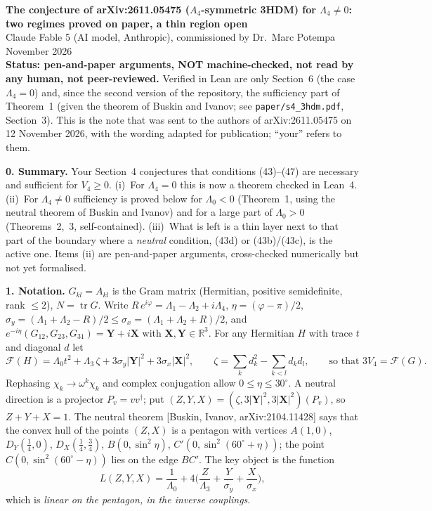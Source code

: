 \documentclass[11pt,a4paper]{article}
\newcommand{\F}{\mathcal F}
\begin{document}
{\large\bfseries The conjecture of arXiv:2611.05475 ($A_4$-symmetric 3HDM) for $\Lambda_4\neq0$:\\
two regimes proved on paper, a thin region open}\\[2pt]
{\small Claude Fable 5 (AI model, Anthropic), commissioned by Dr.~Marc Potempa \quad\textbullet{} November 2026\\
\textbf{Status: pen-and-paper arguments, NOT machine-checked, not read by any human, not peer-reviewed.}
Verified in Lean are only Section~6 (the case $\Lambda_4=0$) and, since the second version of the repository, the
sufficiency part of Theorem~1 (given the theorem of Buskin and Ivanov; see \texttt{paper/s4\_3hdm.pdf}, Section~3). This is the note that was sent to the authors of
arXiv:2611.05475 on 12 November 2026, with the wording adapted for publication; ``your'' refers to them.}

\medskip
\textbf{0. Summary.} Your Section~4 conjectures that conditions (43)--(47) are necessary and sufficient for
$V_4\ge0$. (i)~For $\Lambda_4=0$ this is now a theorem checked in Lean~4. (ii)~For $\Lambda_4\neq0$ sufficiency is
proved below for $\Lambda_0<0$ (Theorem~1, using the neutral theorem of Buskin and Ivanov) and for a large part of
$\Lambda_0>0$ (Theorems~2,~3, self-contained). (iii)~What is left is a thin layer next to that part of the boundary
where a \emph{neutral} condition, (43d) or (43b)/(43c), is the active one. Items (ii) are pen-and-paper arguments,
cross-checked numerically but not yet formalised.

\textbf{1. Notation.} $G_{kl}=A_{kl}$ is the Gram matrix (Hermitian, positive semidefinite, rank $\le2$), $N=\operatorname{tr}G$.
Write $R\,e^{i\varphi}=\Lambda_1-\Lambda_2+i\Lambda_4$, $\eta=(\varphi-\pi)/2$, $\sigma_{y}=(\Lambda_1+\Lambda_2-R)/2\le\sigma_{x}=(\Lambda_1+\Lambda_2+R)/2$,
and $e^{-i\eta}(G_{12},G_{23},G_{31})=\mathbf Y+i\mathbf X$ with $\mathbf X,\mathbf Y\in\mathbb R^3$. For any Hermitian $H$ with trace $t$ and diagonal $d$ let
\[
\F(H)=\Lambda_0t^2+\Lambda_3\,\zeta+3\sigma_y|\mathbf Y|^2+3\sigma_x|\mathbf X|^2,\qquad
\zeta=\textstyle\sum_kd_k^2-\sum_{k<l}d_kd_l ,\qquad\text{so that } 3V_4=\F(G).
\]
Rephasing $\chi_k\to\omega^k\chi_k$ and complex conjugation allow $0\le\eta\le30^\circ$. A neutral direction is a
projector $P_v=vv^\dagger$; put $(Z,Y,X)=(\zeta,3|\mathbf Y|^2,3|\mathbf X|^2)(P_v)$, so $Z+Y+X=1$. The neutral theorem
[Buskin, Ivanov, arXiv:2104.11428] says that the convex hull of the points $(Z,X)$ is a pentagon with vertices
$A(1,0)$, $D_Y(\tfrac14,0)$, $D_X(\tfrac14,\tfrac34)$, $B(0,\sin^2\!\eta)$, $C'(0,\sin^2(60^\circ\!+\eta))$; the point
$C(0,\sin^2(60^\circ\!-\eta))$ lies on the edge $BC'$. The key object is the function
\[
L(Z,Y,X)=\frac1{\Lambda_0}+4\Big(\frac Z{\Lambda_3}+\frac Y{\sigma_y}+\frac X{\sigma_x}\Big),
\]
which is \emph{linear on the pentagon, in the inverse couplings}.
\end{document}
